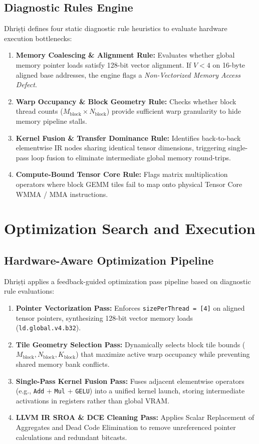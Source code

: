 \documentclass[10pt,journal,compsoc]{IEEEtran}
\begin{document}
\subsection{Diagnostic Rules Engine}
Dhri\d{s}\d{t}i defines four static diagnostic rule heuristics to evaluate hardware execution bottlenecks:
\begin{enumerate}
    \item \textbf{Memory Coalescing \& Alignment Rule:} Evaluates whether global memory pointer loads satisfy 128-bit vector alignment. If $V < 4$ on 16-byte aligned base addresses, the engine flags a \textit{Non-Vectorized Memory Access Defect}.
    \item \textbf{Warp Occupancy \& Block Geometry Rule:} Checks whether block thread counts ($M_{\text{block}} \times N_{\text{block}}$) provide sufficient warp granularity to hide memory pipeline stalls.
    \item \textbf{Kernel Fusion \& Transfer Dominance Rule:} Identifies back-to-back elementwise IR nodes sharing identical tensor dimensions, triggering single-pass loop fusion to eliminate intermediate global memory round-trips.
    \item \textbf{Compute-Bound Tensor Core Rule:} Flags matrix multiplication operators where block GEMM tiles fail to map onto physical Tensor Core WMMA / MMA instructions.
\end{enumerate}

\section{Optimization Search and Execution}\label{sec:optimization}

\subsection{Hardware-Aware Optimization Pipeline}
Dhri\d{s}\d{t}i applies a feedback-guided optimization pass pipeline based on diagnostic rule evaluations:
\begin{enumerate}
    \item \textbf{Pointer Vectorization Pass:} Enforces \texttt{sizePerThread = [4]} on aligned tensor pointers, synthesizing 128-bit vector memory loads (\texttt{ld.global.v4.b32}).
    \item \textbf{Tile Geometry Selection Pass:} Dynamically selects block tile bounds ($M_{\text{block}}, N_{\text{block}}, K_{\text{block}}$) that maximize active warp occupancy while preventing shared memory bank conflicts.
    \item \textbf{Single-Pass Kernel Fusion Pass:} Fuses adjacent elementwise operators (e.g., \texttt{Add} + \texttt{Mul} + \texttt{GELU}) into a unified kernel launch, storing intermediate activations in registers rather than global VRAM.
    \item \textbf{LLVM IR SROA \& DCE Cleaning Pass:} Applies Scalar Replacement of Aggregates and Dead Code Elimination to remove unreferenced pointer calculations and redundant bitcasts.
\end{enumerate}
\end{document}
